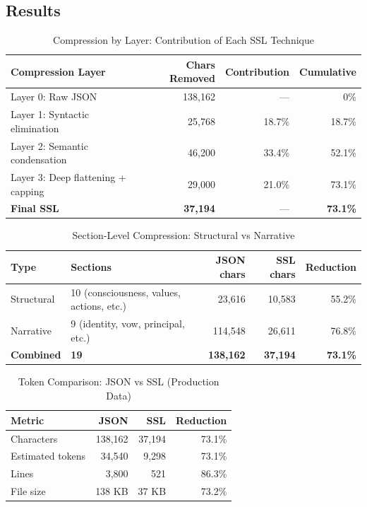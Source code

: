\documentclass[12pt,a4paper]{article}
\theoremstyle{plain}
\theoremstyle{definition}
\theoremstyle{remark}
\begin{document}
\subsection{Results}

\begin{table}[H]
\centering
\caption{Compression by Layer: Contribution of Each SSL Technique}
\label{tab:layers}
\begin{tabular}{@{}lrrr@{}}
\toprule
\textbf{Compression Layer} & \textbf{Chars Removed} & \textbf{Contribution} & \textbf{Cumulative} \\
\midrule
Layer 0: Raw JSON & 138,162 & --- & 0\% \\
Layer 1: Syntactic elimination & 25,768 & 18.7\% & 18.7\% \\
Layer 2: Semantic condensation & 46,200 & 33.4\% & 52.1\% \\
Layer 3: Deep flattening + capping & 29,000 & 21.0\% & 73.1\% \\
\midrule
\textbf{Final SSL} & \textbf{37,194} & --- & \textbf{73.1\%} \\
\bottomrule
\end{tabular}
\end{table}

\begin{table}[H]
\centering
\caption{Section-Level Compression: Structural vs Narrative}
\label{tab:section_types}
\begin{tabular}{@{}llrrr@{}}
\toprule
\textbf{Type} & \textbf{Sections} & \textbf{JSON chars} & \textbf{SSL chars} & \textbf{Reduction} \\
\midrule
Structural & 10 (consciousness, values, actions, etc.) & 23,616 & 10,583 & 55.2\% \\
Narrative & 9 (identity, vow, principal, etc.) & 114,548 & 26,611 & 76.8\% \\
\midrule
\textbf{Combined} & \textbf{19} & \textbf{138,162} & \textbf{37,194} & \textbf{73.1\%} \\
\bottomrule
\end{tabular}
\end{table}

\begin{table}[H]
\centering
\caption{Token Comparison: JSON vs SSL (Production Data)}
\label{tab:comparison}
\begin{tabular}{@{}lrrr@{}}
\toprule
\textbf{Metric} & \textbf{JSON} & \textbf{SSL} & \textbf{Reduction} \\
\midrule
Characters & 138,162 & 37,194 & 73.1\% \\
Estimated tokens & 34,540 & 9,298 & 73.1\% \\
Lines & 3,800 & 521 & 86.3\% \\
File size & 138 KB & 37 KB & 73.2\% \\
\bottomrule
\end{tabular}
\end{table}
\end{document}
